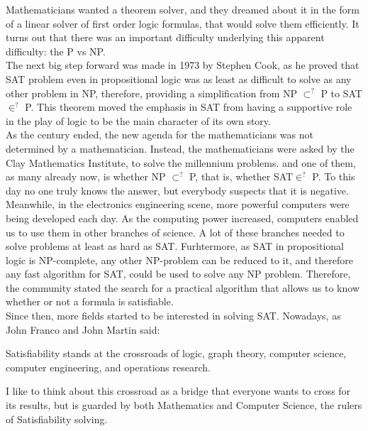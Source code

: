 Mathematicians wanted a theorem solver, and they dreamed about it in the form of a linear solver of first order logic formulas, that would solve them efficiently. It turns out that there was an important difficulty underlying this apparent difficulty: the P vs NP.\\

The next big step forward was made in 1973 by Stephen Cook, as he proved that SAT problem even in propositional logic was as least as difficult to solve as any other problem in NP, therefore, providing a simplification from NP $\subset^?$ P to  SAT $\in^? $ P. This theorem moved the emphasis in SAT from having a supportive role in the play of logic to be the main character of its own story.\\

As the century ended, the new agenda for the mathematicians was not determined by a mathematician. Instead, the mathematicians  were asked by the Clay Mathematics Institute, to solve the millennium problems. and one of them, as many already now, is whether NP $\subset^?$ P, that is, whether SAT$\in^?$ P. To this day no one truly knows the answer, but everybody suspects that it is negative. \\

Meanwhile, in the electronics engineering scene, more powerful computers were being developed each day. As the computing power increased, computers enabled us to use them in other branches of science. A lot of these branches needed to solve problems at least as hard as SAT. Furhtermore, as SAT in propositional logic is NP-complete, any other NP-problem can be reduced to it, and therefore any fast algorithm for SAT, could be used to solve any NP problem. Therefore, the community stated the search for a practical algorithm that  allows us to know whether or not a formula is satisfiable.\\


Since then, more fields started to be interested in solving SAT. Nowadays, as John Franco and John Martin said:
\begin{quoting}
Satisfiability stands at the crossroads of logic, graph theory, computer science, computer engineering, and operations research.
\end{quoting}

I like to think about this crossroad as a bridge that everyone wants to cross for its results, but is guarded by both Mathematics and Computer Science, the rulers of Satisfiability solving.\\

